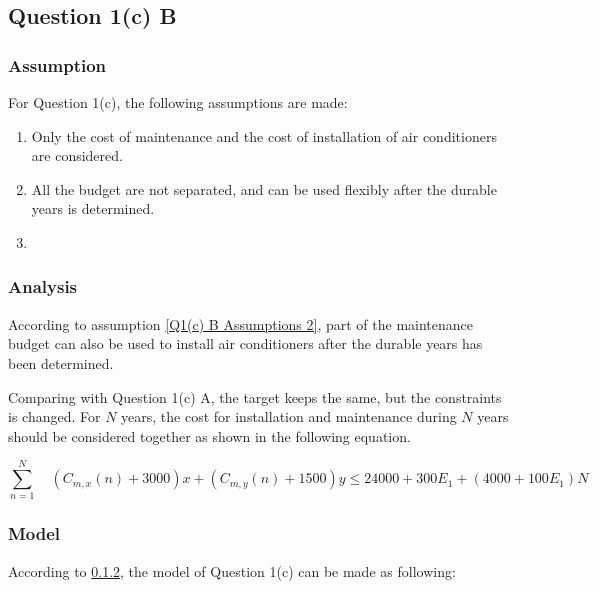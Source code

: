 \documentclass[titlepage,a4paper]{article}
\begin{document}
    \setlength{\parindent}{0pt}
    \setlength{\parskip}{0.5em}

    \subsection{Question 1(c) B}
    

        \subsubsection{Assumption}

        For Question 1(c), the following assumptions are made:

            \begin{enumerate}
                \item Only the cost of maintenance and the cost of installation of air conditioners are considered.
                \item \label{Q1(c) B Assumptions 2} All the budget are not separated, and can be used flexibly after the durable years is determined. 
                \item 
            \end{enumerate}

        \subsubsection{Analysis} \label{Q1(c) B Analysis}
        
        According to assumption \ref{Q1(c) B Assumptions 2}, part of the maintenance budget can also be used to install air conditioners after the durable years has been determined. 

        Comparing with Question 1(c) A, the target keeps the same, but the constraints is changed. For $N$ years, the cost for installation and maintenance during $N$ years should be considered together as shown in the following equation.

            \begin{equation}
                \sum_{n=1}^N \quad (C_{m,x}(n)+3000)x+(C_{m,y}(n)+1500)y \leq 24000+300E_1+(4000+100E_1)N 
            \end{equation}

        \subsubsection{Model}

        According to \ref{Q1(c) B Analysis}, the model of Question 1(c) can be made as following:
\end{document}
